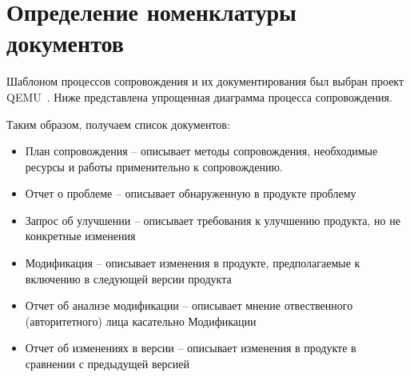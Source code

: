 
\pagebreak


\section{Определение номенклатуры документов}

Шаблоном процессов сопровождения и их документирования был выбран проект QEMU\ \cite{qemucontribute}.
Ниже представлена упрощенная диаграмма процесса сопровождения.

\begin{figure}[ht]
    \begin{center}
    \end {center}\label{fig:maintenance_process}
\end {figure}

Таким образом, получаем список документов:

\begin{itemize}
    \item План сопровождения -- описывает методы сопровождения, необходимые ресурсы и работы применительно к сопровождению.

    \item Отчет о проблеме -- описывает обнаруженную в продукте проблему

    \item Запрос об улучшении -- описывает требования к улучшению продукта, но не конкретные изменения

    \item Модификация -- описывает изменения в продукте, предполагаемые к включению в следующей версии продукта

    \item Отчет об анализе модификации -- описывает мнение отвественного (авторитетного) лица касательно Модификации

    \item Отчет об изменениях в версии -- описывает изменения в продукте в сравнении с предыдущей версией
\end{itemize}
